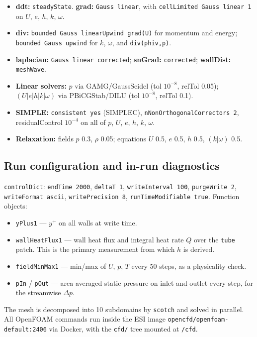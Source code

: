 \documentclass[11pt]{article}
\newcommand{\file}[1]{\texttt{\small #1}}
\begin{document}
\begin{itemize}[leftmargin=1.4em,itemsep=1pt]
\item \textbf{ddt:} \file{steadyState}. \textbf{grad:} \file{Gauss linear}, with \file{cellLimited Gauss
linear 1} on $U$, $e$, $h$, $k$, $\omega$.
\item \textbf{div:} \file{bounded Gauss linearUpwind grad(U)} for momentum and energy; \file{bounded Gauss
upwind} for $k$, $\omega$, and \file{div(phiv,p)}.
\item \textbf{laplacian:} \file{Gauss linear corrected}; \textbf{snGrad:} \file{corrected};
\textbf{wallDist:} \file{meshWave}.
\item \textbf{Linear solvers:} $p$ via GAMG/GaussSeidel (tol $10^{-8}$, relTol 0.05);
$(U|e|h|k|\omega)$ via PBiCGStab/DILU (tol $10^{-8}$, relTol 0.1).
\item \textbf{SIMPLE:} \file{consistent yes} (SIMPLEC), \file{nNonOrthogonalCorrectors 2}, residualControl
$10^{-4}$ on all of $p$, $U$, $e$, $h$, $k$, $\omega$.
\item \textbf{Relaxation:} fields $p$ 0.3, $\rho$ 0.05; equations $U$ 0.5, $e$ 0.5, $h$ 0.5, $(k|\omega)$ 0.5.
\end{itemize}

\subsection{Run configuration and in-run diagnostics}

\file{controlDict}: \file{endTime 2000}, \file{deltaT 1}, \file{writeInterval 100}, \file{purgeWrite 2},
\file{writeFormat ascii}, \file{writePrecision 8}, \file{runTimeModifiable true}. Function objects:

\begin{itemize}[leftmargin=1.4em,itemsep=1pt]
\item \file{yPlus1} --- $y^+$ on all walls at write time.
\item \file{wallHeatFlux1} --- wall heat flux and integral heat rate $Q$ over the \file{tube} patch. This is
the primary measurement from which $h$ is derived.
\item \file{fieldMinMax1} --- min/max of $U$, $p$, $T$ every 50 steps, as a physicality check.
\item \file{pIn} / \file{pOut} --- area-averaged static pressure on inlet and outlet every step, for the
streamwise $\Delta p$.
\end{itemize}

The mesh is decomposed into 10 subdomains by \file{scotch} and solved in parallel. All OpenFOAM commands run
inside the ESI image \file{opencfd/openfoam-default:2406} via Docker, with the \file{cfd/} tree mounted at
\file{/cfd}.
\end{document}
